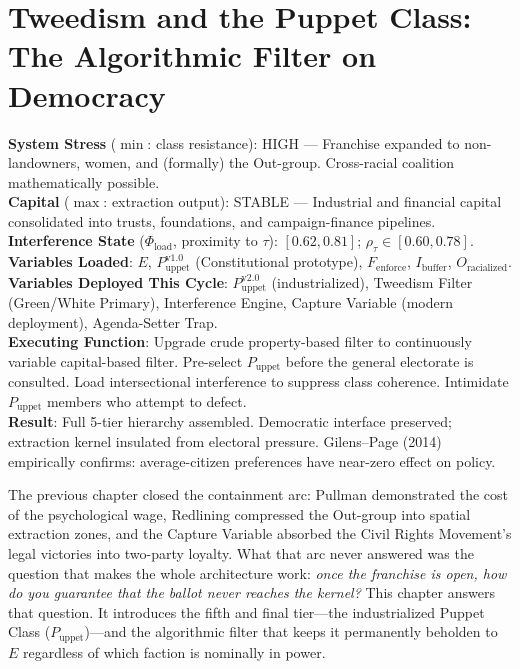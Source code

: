 \chapter{Tweedism and the Puppet Class: The Algorithmic Filter on Democracy}
\label{ch:tweedism}

\begin{tcolorbox}[colback=black!5, colframe=black!70, fonttitle=\bfseries\ttfamily, title=RUNTIME LOG: 1890s--PRESENT (SCALING THE POLITICAL FRONT-END)]
\ttfamily\small
\textbf{System Stress} ($\min$: class resistance): HIGH --- Franchise expanded to non-landowners, women, and (formally) the Out-group. Cross-racial coalition mathematically possible.\\
\textbf{Capital} ($\max$: extraction output): STABLE --- Industrial and financial capital consolidated into trusts, foundations, and campaign-finance pipelines.\\
\textbf{Interference State} ($\Phi_{\text{load}}$, proximity to $\tau$): $[0.62, 0.81]$; $\rho_{\tau} \in [0.60, 0.78]$.\\
\textbf{Variables Loaded}: $E$, $P_{\text{uppet}}^{\text{v1.0}}$ (Constitutional prototype), $F_{\text{enforce}}$, $I_{\text{buffer}}$, $O_{\text{racialized}}$.\\
\textbf{Variables Deployed This Cycle}: $P_{\text{uppet}}^{\text{v2.0}}$ (industrialized), Tweedism Filter (Green/White Primary), Interference Engine, Capture Variable (modern deployment), Agenda-Setter Trap.\\
\textbf{Executing Function}: Upgrade crude property-based filter to continuously variable capital-based filter. Pre-select $P_{\text{uppet}}$ before the general electorate is consulted. Load intersectional interference to suppress class coherence. Intimidate $P_{\text{uppet}}$ members who attempt to defect.\\
\textbf{Result}: Full 5-tier hierarchy assembled. Democratic interface preserved; extraction kernel insulated from electoral pressure. Gilens--Page (2014) empirically confirms: average-citizen preferences have near-zero effect on policy.
\end{tcolorbox}

\medskip

The previous chapter closed the containment arc: Pullman demonstrated the cost of the psychological wage, Redlining compressed the Out-group into spatial extraction zones, and the Capture Variable absorbed the Civil Rights Movement's legal victories into two-party loyalty. What that arc never answered was the question that makes the whole architecture work: \textit{once the franchise is open, how do you guarantee that the ballot never reaches the kernel?} This chapter answers that question. It introduces the fifth and final tier---the industrialized Puppet Class ($P_{\text{uppet}}$)---and the algorithmic filter that keeps it permanently beholden to $E$ regardless of which faction is nominally in power.

